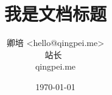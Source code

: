 \title{\textbf{我是文档标题}}

\author{卿培 <hello@qingpei.me> \\
        站长~\\
        qingpei.me
}

\date{\today}
